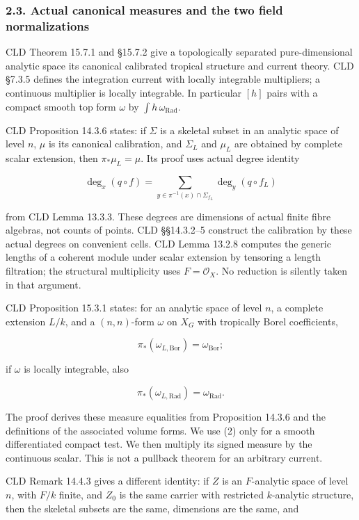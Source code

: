 \documentclass[
  11pt,
]{article}
\begin{document}
\subsubsection{2.3. Actual canonical measures and the two field
normalizations}\label{actual-canonical-measures-and-the-two-field-normalizations}

CLD Theorem 15.7.1 and §15.7.2 give a topologically separated
pure-dimensional analytic space its canonical calibrated tropical
structure and current theory. CLD §7.3.5 defines the integration current
with locally integrable multipliers; a continuous multiplier is locally
integrable. In particular \([h]\) pairs with a compact smooth top form
\(\omega\) by \(\int h\,\omega_{\mathrm{Rad}}\).

CLD Proposition 14.3.6 states: if \(\Sigma\) is a skeletal subset in an
analytic space of level \(n\), \(\mu\) is its canonical calibration, and
\(\Sigma_L\) and \(\mu_L\) are obtained by complete scalar extension,
then \(\pi_*\mu_L=\mu\). Its proof uses actual degree identity

\[
\deg_x(q\circ f)=\sum_{y\in\pi^{-1}(x)\cap\Sigma_{f_L}}\deg_y(q\circ f_L)
\]

from CLD Lemma 13.3.3. These degrees are dimensions of actual finite
fibre algebras, not counts of points. CLD §§14.3.2--5 construct the
calibration by these actual degrees on convenient cells. CLD Lemma
13.2.8 computes the generic lengths of a coherent module under scalar
extension by tensoring a length filtration; the structural multiplicity
uses \(F=\mathcal O_X\). No reduction is silently taken in that
argument.

CLD Proposition 15.3.1 states: for an analytic space of level \(n\), a
complete extension \(L/k\), and a \((n,n)\)-form \(\omega\) on \(X_G\)
with tropically Borel coefficients,

\[\pi_*(\omega_{L,\mathrm{Bor}})=\omega_{\mathrm{Bor}};\]

if \(\omega\) is locally integrable, also

\[\pi_*(\omega_{L,\mathrm{Rad}})=\omega_{\mathrm{Rad}}. \tag{2}\]

The proof derives these measure equalities from Proposition 14.3.6 and
the definitions of the associated volume forms. We use (2) only for a
smooth differentiated compact test. We then multiply its signed measure
by the continuous scalar. This is not a pullback theorem for an
arbitrary current.

CLD Remark 14.4.3 gives a different identity: if \(Z\) is an
\(F\)-analytic space of level \(n\), with \(F/k\) finite, and \(Z_0\) is
the same carrier with restricted \(k\)-analytic structure, then the
skeletal subsets are the same, dimensions are the same, and
\end{document}
